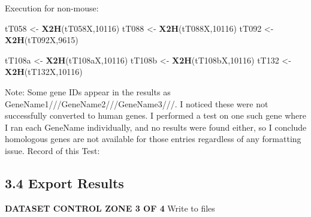 \documentclass[
]{article}
\newenvironment{Shaded}{\begin{snugshade}}{\end{snugshade}}
\newcommand{\CommentTok}[1]{\textcolor[rgb]{0.56,0.35,0.01}{\textit{#1}}}
\newcommand{\DecValTok}[1]{\textcolor[rgb]{0.00,0.00,0.81}{#1}}
\newcommand{\KeywordTok}[1]{\textcolor[rgb]{0.13,0.29,0.53}{\textbf{#1}}}
\newcommand{\NormalTok}[1]{#1}
\newcommand{\StringTok}[1]{\textcolor[rgb]{0.31,0.60,0.02}{#1}}
\begin{document}
Execution for non-mouse:

\begin{Shaded}
\begin{Highlighting}[]
\NormalTok{tT058 <-}\StringTok{ }\KeywordTok{X2H}\NormalTok{(tT058X,}\DecValTok{10116}\NormalTok{)}
\NormalTok{tT088 <-}\StringTok{ }\KeywordTok{X2H}\NormalTok{(tT088X,}\DecValTok{10116}\NormalTok{)}
\NormalTok{tT092 <-}\StringTok{ }\KeywordTok{X2H}\NormalTok{(tT092X,}\DecValTok{9615}\NormalTok{)}

\NormalTok{tT108a <-}\StringTok{ }\KeywordTok{X2H}\NormalTok{(tT108aX,}\DecValTok{10116}\NormalTok{)}
\NormalTok{tT108b <-}\StringTok{ }\KeywordTok{X2H}\NormalTok{(tT108bX,}\DecValTok{10116}\NormalTok{)}
\NormalTok{tT132 <-}\StringTok{ }\KeywordTok{X2H}\NormalTok{(tT132X,}\DecValTok{10116}\NormalTok{)}
\end{Highlighting}
\end{Shaded}

Note: Some gene IDs appear in the results as
GeneName1///GeneName2///GeneName3///. I noticed these were not
successfully converted to human genes. I performed a test on one such
gene where I ran each GeneName individually, and no results were found
either, so I conclude homologous genes are not available for those
entries regardless of any formatting issue. Record of this Test:

\begin{Shaded}
\end{Shaded}

\hypertarget{export-results}{%
\subsection{3.4 Export Results}\label{export-results}}

\textbf{DATASET CONTROL ZONE 3 OF 4} Write to files
\end{document}
